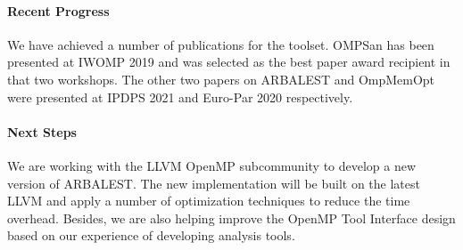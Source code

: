 \paragraph{Recent Progress}
We have achieved a number of publications for the toolset. OMPSan has been presented at IWOMP 2019 and was selected as the best paper award recipient in that two workshops. The other two papers on ARBALEST and OmpMemOpt were presented at IPDPS 2021 and Euro-Par 2020 respectively.

\paragraph{Next Steps}
We are working with the LLVM OpenMP subcommunity to develop a new version of ARBALEST. The new implementation will be built on the latest LLVM and apply a number of optimization techniques to reduce the time overhead. Besides, we are also helping improve the OpenMP Tool Interface design based on our experience of developing analysis tools.